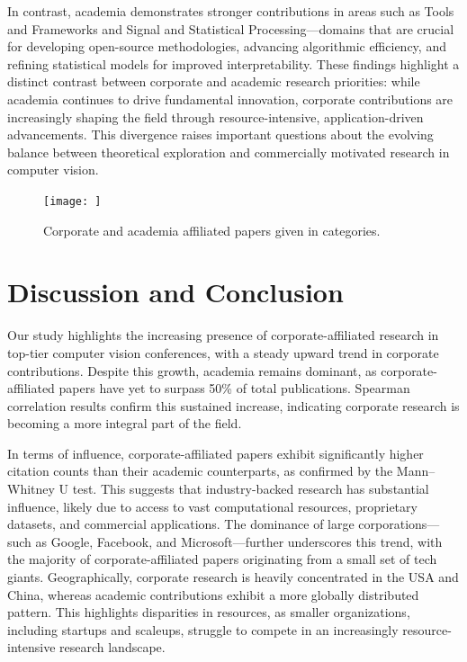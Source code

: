 \documentclass{article}
\begin{document}
In contrast, academia demonstrates stronger contributions in areas such as Tools and Frameworks and Signal and Statistical Processing—domains that are crucial for developing open-source methodologies, advancing algorithmic efficiency, and refining statistical models for improved interpretability. These findings highlight a distinct contrast between corporate and academic research priorities: while academia continues to drive fundamental innovation, corporate contributions are increasingly shaping the field through resource-intensive, application-driven advancements. This divergence raises important questions about the evolving balance between theoretical exploration and commercially motivated research in computer vision.



\begin{figure}[ht]
  \centering
  \texttt{[image: ]}  
  \caption{Corporate and academia affiliated papers given in categories.}
  \label{fig:research_focus_radar}
\end{figure}

\section{Discussion and Conclusion}
Our study highlights the increasing presence of corporate-affiliated research in top-tier computer vision conferences, with a steady upward trend in corporate contributions. Despite this growth, academia remains dominant, as corporate-affiliated papers have yet to surpass 50\% of total publications. Spearman correlation results confirm this sustained increase, indicating corporate research is becoming a more integral part of the field.

In terms of influence, corporate-affiliated papers exhibit significantly higher citation counts than their academic counterparts, as confirmed by the Mann–Whitney U test. This suggests that industry-backed research has substantial influence, likely due to access to vast computational resources, proprietary datasets, and commercial applications. The dominance of large corporations—such as Google, Facebook, and Microsoft—further underscores this trend, with the majority of corporate-affiliated papers originating from a small set of tech giants. Geographically, corporate research is heavily concentrated in the USA and China, whereas academic contributions exhibit a more globally distributed pattern. This highlights disparities in resources, as smaller organizations, including startups and scaleups, struggle to compete in an increasingly resource-intensive research landscape.
\end{document}
